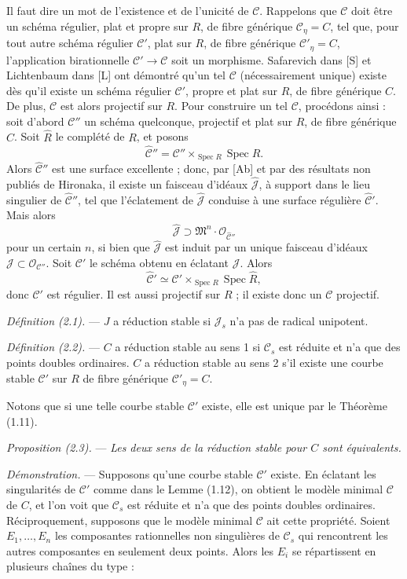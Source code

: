 \documentclass[10pt]{article}
\newcommand{\Spec}{\operatorname{Spec}}
\newcommand{\cO}{\mathcal O}
\begin{document}
Il faut dire un mot de l'existence et de l'unicité de $\mathscr C$. Rappelons que $\mathscr C$ doit être un schéma régulier, plat et propre sur $R$, de fibre générique $\mathscr C_\eta=C$, tel que, pour tout autre schéma régulier $\mathscr C'$, plat sur $R$, de fibre générique $\mathscr C'_\eta=C$, l'application birationnelle $\mathscr C'\to\mathscr C$ soit un morphisme. Safarevich dans [S] et Lichtenbaum dans [L] ont démontré qu'un tel $\mathscr C$ (nécessairement unique) existe dès qu'il existe un schéma régulier $\mathscr C'$, propre et plat sur $R$, de fibre générique $C$. De plus, $\mathscr C$ est alors projectif sur $R$. Pour construire un tel $\mathscr C$, procédons ainsi : soit d'abord $\mathscr C''$ un schéma quelconque, projectif et plat sur $R$, de fibre générique $C$. Soit $\widehat R$ le complété de $R$, et posons
\[
\widehat{\mathscr C}''=\mathscr C''\times_{\Spec R}\Spec\widehat R.
\]
Alors $\widehat{\mathscr C}''$ est une surface excellente ; donc, par [Ab] et par des résultats non publiés de Hironaka, il existe un faisceau d'idéaux $\widehat{\mathcal J}$, à support dans le lieu singulier de $\widehat{\mathscr C}''$, tel que l'éclatement de $\widehat{\mathcal J}$ conduise à une surface régulière $\widehat{\mathscr C}'$. Mais alors
\[
\widehat{\mathcal J}\supset \mathfrak M^n\cdot\cO_{\widehat{\mathscr C}''}
\]
pour un certain $n$, si bien que $\widehat{\mathcal J}$ est induit par un unique faisceau d'idéaux $\mathcal J\subset\cO_{\mathscr C''}$. Soit $\mathscr C'$ le schéma obtenu en éclatant $\mathcal J$. Alors
\[
\widehat{\mathscr C}'\simeq \mathscr C'\times_{\Spec R}\Spec\widehat R,
\]
donc $\mathscr C'$ est régulier. Il est aussi projectif sur $R$ ; il existe donc un $\mathscr C$ projectif.


\noindent\emph{Définition (2.1).} --- $J$ a réduction stable si $\mathscr J_s$ n'a pas de radical unipotent.

\noindent\emph{Définition (2.2).} --- $C$ a réduction stable au sens 1 si $\mathscr C_s$ est réduite et n'a que des points doubles ordinaires. $C$ a réduction stable au sens 2 s'il existe une courbe stable $\mathscr C'$ sur $R$ de fibre générique $\mathscr C'_\eta=C$.

Notons que si une telle courbe stable $\mathscr C'$ existe, elle est unique par le Théorème (1.11).

\medskip
\noindent\emph{Proposition (2.3).} --- \emph{Les deux sens de la réduction stable pour $C$ sont équivalents.}

\noindent\emph{Démonstration.} --- Supposons qu'une courbe stable $\mathscr C'$ existe. En éclatant les singularités de $\mathscr C'$ comme dans le Lemme (1.12), on obtient le modèle minimal $\mathscr C$ de $C$, et l'on voit que $\mathscr C_s$ est réduite et n'a que des points doubles ordinaires. Réciproquement, supposons que le modèle minimal $\mathscr C$ ait cette propriété. Soient $E_1,\ldots,E_n$ les composantes rationnelles non singulières de $\mathscr C_s$ qui rencontrent les autres composantes en seulement deux points. Alors les $E_i$ se répartissent en plusieurs chaînes du type :
\end{document}
